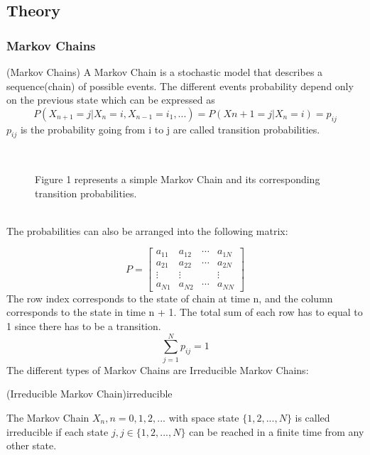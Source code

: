 
\subsection{Theory}
\label{sec:theory1}
\subsubsection{Markov Chains}
\label{sec:markov1}
\begin{definition}{(Markov Chains)}
    A Markov Chain is a stochastic model that describes a sequence(chain) of possible events. The different events probability depend only on the previous state which can be expressed as
\begin{equation}
    P(X_{n+1} = j|X_n = i,X_{n−1} = i_1,...) = P(X{n+1} = j|X_n = i) = p_{ij}
\end{equation}
$p_{ij}$ is the probability going from i to j are called transition probabilities.
\end{definition}

\\
\begin{figure}[H]
    \centering
    \triangles{}
    \caption{Figure 1 represents a simple Markov Chain and its corresponding transition probabilities.}
\end{figure}


\\The probabilities can also be arranged into the following matrix:

\begin{equation*}
P = 
\begin{bmatrix}
a_{11} & a_{12} & \cdots & a_{1N} \\
a_{21} & a_{22} & \cdots & a_{2N} \\
\vdots  & \vdots  &  & \vdots  \\
a_{N1} & a_{N2} & \cdots & a_{NN} 
\end{bmatrix}
\end{equation*}
The row index corresponds to the state of chain at time n, and
the column corresponds to the state in time n + 1. The total sum of each row has to equal to 1 since there has to be a transition.
\begin{equation}
    \sum_{j=1}^{N} p_{ij} = 1
\end{equation}
The different types of Markov Chains are Irreducible Markov Chains:

\begin{definition}{(Irreducible Markov Chain)}{irreducible}

The Markov Chain $X_n,n = 0,1,2,...$ with space state $\{1,2,...,N\}$
is called irreducible if each state $j,j ∈\{1,2,...,N\}$ can be
reached in a finite time from any other state.
\end{definition}

